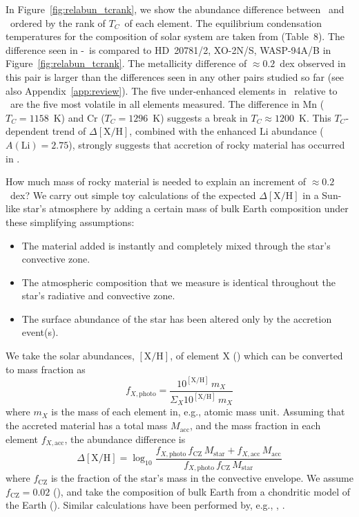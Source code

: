 \documentclass[modern, letterpaper]{aastex61}
\newcommand{\figname}{Figure}
\newcommand*\elem[1]{\ensuremath{\mathrm{#1}}}
\newcommand*\elemH[1]{\ensuremath{[\mathrm{#1}/\elem{H}]}}
\newcommand{\sunanalog}{\text{Krios}}
\newcommand{\bizarreone}{\text{Kronos}}
\newcommand{\Tcondens}{\ensuremath{T_C}}
\begin{document}
In Figure~\ref{fig:relabun_tcrank}, we show the abundance difference
between \bizarreone\ and \sunanalog\ ordered by the rank of \Tcondens\
of each element.
The equilibrium condensation temperatures for the composition of solar system
are taken from \citealt{2003ApJ...591.1220L} (Table~8).
The difference seen in \bizarreone-\sunanalog\ is
compared to HD~20781/2, XO-2N/S, WASP-94A/B in \figname~\ref{fig:relabun_tcrank}.
The metallicity difference of $\approx 0.2$~dex observed in this pair
is larger than the differences seen in any other pairs studied so far
(see also Appendix~\ref{app:review}).
The five under-enhanced elements in \bizarreone\
relative to \sunanalog\ are the five most volatile in all elements measured.
The difference in \elem{Mn} ($\Tcondens = 1158$~K) and
\elem{Cr} ($\Tcondens = 1296$~K) suggests a break in $\Tcondens \approx 1200$~K.
This $\Tcondens$-dependent trend of $\Delta\elemH{X}$,
combined with the enhanced $\elem{Li}$ abundance ($A(\elem{Li}) = 2.75$),
strongly suggests that accretion of rocky material has occurred in \bizarreone.

How much mass of rocky material is needed to explain an increment of
$\approx 0.2$~dex?
We carry out simple toy calculations of the expected $\Delta\elemH{X}$
in a Sun-like star's atmosphere by adding a certain mass of bulk Earth composition
under these simplifying assumptions:
\begin{itemize}
  \item The material added is instantly and completely mixed through the star's convective zone.
  \item The atmospheric composition that we measure is identical throughout
    the star's radiative and convective zone.
  \item The surface abundance of the star has been altered only by the
    accretion event(s).
\end{itemize}

We take the solar abundances, $\elemH{X}$, of element \elem{X}
(\citealt{Asplund:2009aa}) which can be converted to mass fraction as
\begin{equation}
  f_{X,\mathrm{photo}} = \frac{10^{\elemH{X}} \, m_X}{\Sigma_X 10^{\elemH{X}} \, m_X}
\end{equation}
where $m_X$ is the mass of each element in, e.g., atomic mass unit.
Assuming that the accreted material has a total mass $M_\mathrm{acc}$, and the
mass fraction in each element $f_{X,\mathrm{acc}}$,
the abundance difference is
\begin{equation}
  \Delta\elemH{X} = \log_{10} \frac{f_{X,\mathrm{photo}}\,f_\mathrm{CZ}\,M_\mathrm{star}
    + f_{X,\mathrm{acc}}\,M_\mathrm{acc}}
    {f_{X,\mathrm{photo}}\,f_\mathrm{CZ}\,M_\mathrm{star}}
\end{equation}
where $f_\mathrm{CZ}$ is the fraction of the star's mass in the convective envelope.
We assume $f_\mathrm{CZ} = 0.02$ (\citealt{2013ApJ...776...87S}),
and take the composition of bulk Earth from a chondritic model of the Earth
(\citealt{2003TrGeo...2..547M}).
Similar calculations have been performed by, e.g., \citet{Chambers:2010aa},
\citet{Mack:2014aa,Mack:2016aa}.
\end{document}
